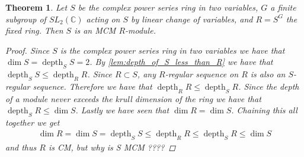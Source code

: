 \documentclass[11pt, a4paper, english]{article}
\numberwithin{prop}{section}
\numberwithin{lemma}{section}
\newtheorem{theorem}{Theorem}
\numberwithin{theorem}{section}
\numberwithin{defin}{section}
\numberwithin{example}{section}
\newcommand{\C}{\mathbb{C}}
\DeclareMathOperator{\depth}{depth}
\begin{document}
\begin{theorem}
Let $S$ be the complex power series ring in two variables, $G$ a finite subgroup of $SL_2(\C)$ acting on $S$ by linear change of variables, and $R=S^G$ the fixed ring. Then $S$ is an MCM $R$-module.
\begin{proof}
Since $S$ is the complex power series ring in two variables we have that $\dim S = \depth_SS=2$. By \cref{lem:depth_of_S_less_than_R} we have that $\depth_SS \leq \depth_RR$. Since $R \subset S$, any $R$-regular sequence on $R$ is also an $S$-regular sequence. Therefore we have that $\depth_RR \leq \depth_SR$. Since the depth of a module never exceeds the krull dimension of the ring we have that $\depth_SR \leq \dim S$. Lastly we have seen that $\dim R = \dim S$. Chaining this all together we get
\begin{align*}
\dim R = \dim S = \depth_SS \leq \depth_RR \leq \depth_SR \leq \dim S
\end{align*}
and thus $R$ is CM, but why is S MCM {\color{red} ????}
\end{proof}
\end{theorem}
\end{document}
